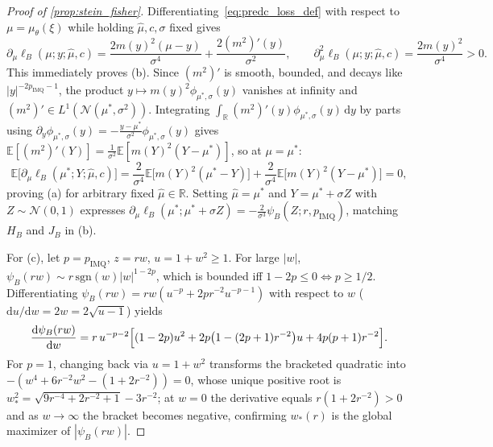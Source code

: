 \documentclass[11pt,a4paper,reqno]{amsart}
\theoremstyle{definition}
\theoremstyle{remark}
\newcommand{\R}{\mathbb{R}}
\newcommand{\E}{\mathbb{E}}
\newcommand{\Ncal}{\mathcal{N}}
\newcommand{\dd}{\mathrm{d}}
\begin{document}
\begin{proof}[Proof of \cref{prop:stein_fisher}]
Differentiating~\eqref{eq:predc_loss_def} with respect to $\mu = \mu_\theta(\xi)$ while holding $\hat{\mu}, c, \sigma$ fixed gives
\[
\partial_\mu \ell_B(\mu; y; \hat{\mu}, c) = \frac{2 m(y)^2 (\mu - y)}{\sigma^4} + \frac{2 (m^2)'(y)}{\sigma^2}, \qquad
\partial_\mu^2 \ell_B(\mu; y; \hat{\mu}, c) = \frac{2 m(y)^2}{\sigma^4} > 0.
\]
This immediately proves (b). Since $(m^2)'$ is smooth, bounded, and decays like $|y|^{-2p_{\mathrm{IMQ}}-1}$, the product $y \mapsto m(y)^2 \phi_{\mu^*, \sigma}(y)$ vanishes at infinity and $(m^2)' \in L^1(\Ncal(\mu^*, \sigma^2))$. Integrating $\int_\R (m^2)'(y) \phi_{\mu^*, \sigma}(y)\,\dd y$ by parts~\cite{hyvarinen2005score} using $\partial_y \phi_{\mu^*, \sigma}(y) = -\frac{y-\mu^*}{\sigma^2}\phi_{\mu^*, \sigma}(y)$ gives $\E[(m^2)'(Y)] = \frac{1}{\sigma^2}\E[m(Y)^2(Y - \mu^*)]$, so at $\mu = \mu^*$:
\[
\E\bigl[\partial_\mu \ell_B(\mu^*; Y; \hat{\mu}, c)\bigr] = \frac{2}{\sigma^4}\E\bigl[m(Y)^2(\mu^* - Y)\bigr] + \frac{2}{\sigma^4}\E\bigl[m(Y)^2(Y - \mu^*)\bigr] = 0,
\]
proving (a) for arbitrary fixed $\hat{\mu} \in \R$. Setting $\hat{\mu} = \mu^*$ and $Y = \mu^* + \sigma Z$ with $Z \sim \Ncal(0,1)$ expresses $\partial_\mu \ell_B(\mu^*; \mu^* + \sigma Z) = -\frac{2}{\sigma^3}\psi_B(Z; r, p_{\mathrm{IMQ}})$, matching $H_B$ and $J_B$ in (b).

For (c), let $p = p_{\mathrm{IMQ}}$, $z = rw$, $u = 1 + w^2 \ge 1$. For large $|w|$, $\psi_B(rw) \sim r\,\mathrm{sgn}(w)|w|^{1-2p}$, which is bounded iff $1 - 2p \le 0 \iff p \ge 1/2$. Differentiating $\psi_B(rw) = r w (u^{-p} + 2p r^{-2} u^{-p-1})$ with respect to $w$ ($\dd u / \dd w = 2w = 2\sqrt{u-1}$) yields
\[
\frac{\dd \psi_B(rw)}{\dd w} = r\,u^{-p-2}\Bigl[(1 - 2p)u^2 + 2p\bigl(1 - (2p+1)r^{-2}\bigr)u + 4p(p+1)r^{-2}\Bigr].
\]
For $p = 1$, changing back via $u = 1 + w^2$ transforms the bracketed quadratic into $-(w^4 + 6r^{-2}w^2 - (1 + 2r^{-2})) = 0$, whose unique positive root is $w_*^2 = \sqrt{9r^{-4} + 2r^{-2} + 1} - 3r^{-2}$; at $w=0$ the derivative equals $r(1 + 2r^{-2}) > 0$ and as $w \to \infty$ the bracket becomes negative, confirming $w_*(r)$ is the global maximizer of $|\psi_B(rw)|$.
\end{proof}
\end{document}
